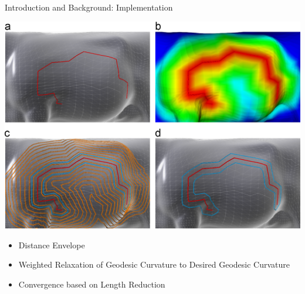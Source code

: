 \documentclass[aspectratio=169,fleqn]{beamer}
\begin{document}
  \begin{frame}{Introduction and Background: Implementation}
    \begin{minipage}[c]{0.45\linewidth}
      \includegraphics[width=\linewidth]{images/lawonn2014-3.png}
    \end{minipage}
    \hfill
    \begin{minipage}[c]{0.45\linewidth}
      \pause
      \begin{itemize}
        \item<+-> Distance Envelope
        \item<+-> Weighted Relaxation of Geodesic Curvature to Desired Geodesic Curvature
        \item<+-> Convergence based on Length Reduction
      \end{itemize}
    \end{minipage}
  \end{frame}
\end{document}
